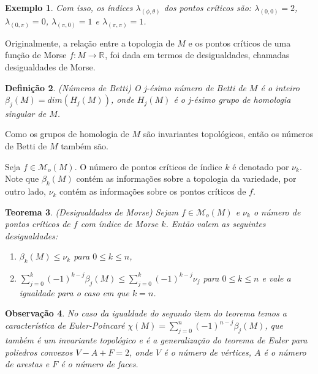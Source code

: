 \documentclass[12pt]{book}
\newtheorem{teorema}{Teorema}[section]
\newtheorem{definicao}[teorema]{Definição}
\newtheorem{exemplo}[teorema]{Exemplo}
\newtheorem{observacao}[teorema]{Observação}
\newcommand{\funcoesmorse}[1]{\mathcal{M}_{o}(#1)}
\newcommand{\real}[1]{\mathbb{R}^{#1}}
\newcommand{\reta}{\real{}}
\begin{document}
\begin{exemplo}
			Com isso, os índices $\lambda_{(\phi, \theta)}$ dos pontos críticos são: $\lambda_{(0,0)} = 2$, $\lambda_{(0,\pi)} = 0$, $\lambda_{(\pi,0)} = 1$ e $\lambda_{(\pi,\pi)} = 1$.
			
	\end{exemplo}

	Originalmente, a relação entre a topologia de $M$ e os pontos críticos de uma função de Morse $f:M \to \reta$, foi dada em termos de desigualdades, chamadas desigualdades de Morse.
	
	\begin{definicao}
		(Números de Betti) O j-ésimo número de Betti de $M$ é o inteiro $\beta_{j}(M) = dim(H_{j}(M))$, onde $H_{j}(M)$ é o j-ésimo grupo de homologia singular de $M$.
	\end{definicao}
	
	Como os grupos de homologia de $M$ são invariantes topológicos, então os números de Betti de $M$ também são.
	
	Seja $f \in \funcoesmorse{M}$. O número de pontos críticos de índice $k$ é denotado por $\nu_{k}$. Note que $\beta_{k}(M)$ contém as informações sobre a topologia da variedade, por outro lado, $\nu_{k}$ contém as informações sobre os pontos críticos de $f$.
	
	\begin{teorema}
		(Desigualdades de Morse) Sejam $f \in \funcoesmorse{M}$ e $\nu_{k}$ o número de pontos críticos de $f$ com índice de Morse $k$. Então valem as seguintes desigualdades:
		\begin{enumerate}
			\item $\beta_{k}(M) \leq \nu_{k}$ para $0\leq k\leq n$,
			
			\item $\sum_{j = 0}^{k}(-1)^{k-j}\beta_{j}(M) \leq \sum_{j = 0}^{k}(-1)^{k-j}\nu_{j} $ para $0 \leq k \leq n$ e vale a igualdade para o caso em que $k=n$.
		\end{enumerate}
	\end{teorema}
	
	\begin{observacao}
		No caso da igualdade do segundo item do teorema temos a característica de Euler-Poincaré $\chi(M) = \sum_{j = 0}^{n}(-1)^{n-j}\beta_{j}(M)$, que também é um invariante topológico e é a generalização do teorema de Euler para poliedros convexos $V-A+F = 2$, onde $V$ é o número de vértices, $A$ é o número de arestas e $F$ é o número de faces.
	\end{observacao}
	
\end{document}
